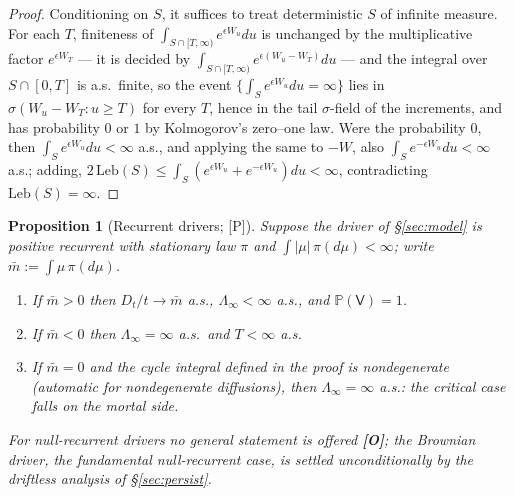 \documentclass[11pt]{article}
\newtheorem{proposition}[theorem]{Proposition}
\theoremstyle{definition}
\theoremstyle{remark}
\newcommand{\PP}{\mathbb{P}}
\newcommand{\Imm}{\mathsf{V}}
\begin{document}
\begin{proof}
Conditioning on $S$, it suffices to treat deterministic $S$ of
infinite measure. For each $T$, finiteness of
$\int_{S\cap[T,\infty)}e^{\epsilon W_u}du$ is unchanged by the
multiplicative factor $e^{\epsilon W_T}$ --- it is decided by
$\int_{S\cap[T,\infty)}e^{\epsilon(W_u-W_T)}du$ --- and the integral
over $S\cap[0,T]$ is a.s.\ finite, so the event
$\{\int_Se^{\epsilon W_u}du=\infty\}$ lies in
$\sigma(W_u-W_T:u\ge T)$ for every $T$, hence in the tail
$\sigma$-field of the increments, and has probability $0$ or $1$ by
Kolmogorov's zero--one law. Were the probability $0$, then
$\int_Se^{\epsilon W_u}du<\infty$ a.s., and applying the same to $-W$,
also $\int_Se^{-\epsilon W_u}du<\infty$ a.s.; adding,
$2\,\mathrm{Leb}(S)\le\int_S(e^{\epsilon W_u}+e^{-\epsilon W_u})du
<\infty$, contradicting $\mathrm{Leb}(S)=\infty$.
\end{proof}

\begin{proposition}[Recurrent drivers; {[P]}]\label{prop:recurrent}
Suppose the driver of \S\ref{sec:model} is positive recurrent with
stationary law $\pi$ and $\int|\mu|\,\pi(d\mu)<\infty$; write
$\bar m:=\int\mu\,\pi(d\mu)$.
\begin{enumerate}[label=\emph{(\alph*)},itemsep=1pt]
\item If $\bar m>0$ then $D_t/t\to\bar m$ a.s., $\Lambda_\infty<\infty$
a.s., and $\PP(\Imm)=1$.
\item If $\bar m<0$ then $\Lambda_\infty=\infty$ a.s.\ and $T<\infty$ a.s.
\item If $\bar m=0$ and the cycle integral defined in the proof is
nondegenerate (automatic for nondegenerate diffusions), then
$\Lambda_\infty=\infty$ a.s.: \emph{the critical case falls on the mortal
side.}
\end{enumerate}
For null-recurrent drivers no general statement is offered
\textbf{[O]}; the Brownian driver, the fundamental null-recurrent case, is
settled unconditionally by the driftless analysis of \S\ref{sec:persist}.
\end{proposition}
\end{document}
